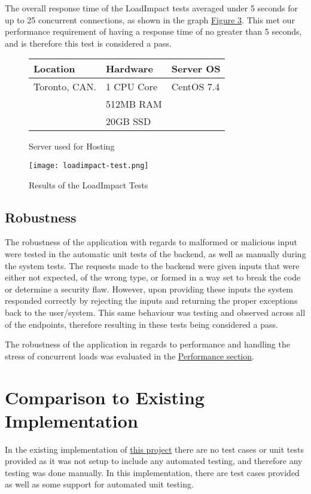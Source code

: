 \documentclass[12pt, titlepage]{article}
\begin{document}
The overall response time of the LoadImpact tests averaged under 5 seconds for up to 25 concurrent connections, as shown in the graph \hyperref[fig:figure3]{Figure 3}. This met our performance requirement of having a response time of no greater than 5 seconds, and is therefore this test is considered a pass.

\begin{figure}[h]
\centering
\begin{tabular}{| p{3cm} | p{3cm} | p{3cm} |}
\hline
\textbf{Location} & \textbf{Hardware} & \textbf{Server OS}\\
\hline
Toronto, CAN. & 1 CPU Core & CentOS 7.4\\
 & 512MB RAM & \\
 & 20GB SSD & \\
\hline
\end{tabular}
\caption{Server used for Hosting}
\label{fig:table2}
\end{figure}

\begin{figure}[h]
\centering
\texttt{[image: loadimpact-test.png]}
\caption{Results of the LoadImpact Tests}
\label{fig:figure3}
\end{figure}

\subsection{Robustness}
The robustness of the application with regards to malformed or malicious input were tested in the automatic unit tests of the backend, as well as manually during the system tests. The requests made to the backend were given inputs that were either not expected, of the wrong type, or formed in a way set to break the code or determine a security flaw. However, upon providing these inputs the system responded correctly by rejecting the inputs and returning the proper exceptions back to the user/system. This same behaviour was testing and observed across all of the endpoints, therefore resulting in these tests being considered a pass.

The robustness of the application in regards to performance and handling the stress of concurrent loads was evaluated in the \hyperref[sec:performance]{Performance section}.
	
\section{Comparison to Existing Implementation}
In the existing implementation of \href{https://github.com/siamon123/warehouse-inventory-system}{this project} there are no test cases or unit tests provided as it was not setup to include any automated testing, and therefore any testing was done manually. In this implementation, there are test cases provided as well as some support for automated unit testing.
\end{document}
